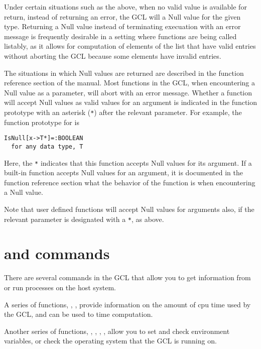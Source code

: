 Under certain situations such as the above, when no valid value is
available for return, instead of returning an error, the GCL will
a Null value for the given type.  Returning a Null value instead of
terminating execuation with an error message is frequently desirable
in a setting where functions are being called listably, as it allows
for computation of elements of the list that have valid entries
without aborting the GCL because some elements have invalid entries.  

The situations in which Null values are returned are described in the
function reference section of the manual.  Most functions in the GCL,
when encountering a Null value as a parameter, will abort with an
error message.  Whether a function will accept Null values as valid
values for an argument is indicated in the function prototype with an
asterisk (\verb+*+) after the relevant parameter.  For example, the
function prototype for  is

\begin{verbatim}
IsNull[x->T*]=:BOOLEAN
  for any data type, T
\end{verbatim}

Here, the \verb+*+ indicates that this function accepts Null values
for its argument.  If a built-in function accepts Null values for an
argument, it is documented in the function reference section what the
behavior of the function is when encountering a Null value.  

Note that user defined functions  will accept Null values for
arguments also, if the relevant parameter is designated with a
\verb+*+, as above. 

\section{ and commands}

There are several commands in the GCL that allow you to get
information from or run processes on the host system.  

A series of functions, , ,
 provide information on the amount of cpu time
used by the GCL, and can be used to time computation.  

Another series of functions, , ,
, , allow you to set and check
environment variables, or check the operating system that the GCL is
running on.

